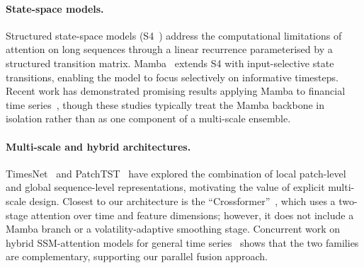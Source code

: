 \documentclass[runningheads]{llncs}
\begin{document}
\paragraph{State-space models.}
Structured state-space models (S4~\cite{gu2022efficiently}) address the
computational limitations of attention on long sequences through a linear
recurrence parameterised by a structured transition matrix.  Mamba~\cite{gu2023mamba}
extends S4 with input-selective state transitions, enabling the model to focus
selectively on informative timesteps.  Recent work has demonstrated promising
results applying Mamba to financial time series~\cite{xu2024mamba}, though these
studies typically treat the Mamba backbone in isolation rather than as one
component of a multi-scale ensemble.

\paragraph{Multi-scale and hybrid architectures.}
TimesNet~\cite{wu2023timesnet} and PatchTST~\cite{nie2022time} have explored
the combination of local patch-level and global sequence-level representations,
motivating the value of explicit multi-scale design.  Closest to our architecture
is the ``Crossformer''~\cite{zhang2023crossformer}, which uses a two-stage
attention over time and feature dimensions; however, it does not include a Mamba
branch or a volatility-adaptive smoothing stage.  Concurrent work on hybrid
SSM-attention models for general time series~\cite{lieber2024jamba} shows that
the two families are complementary, supporting our parallel fusion approach.
\end{document}
